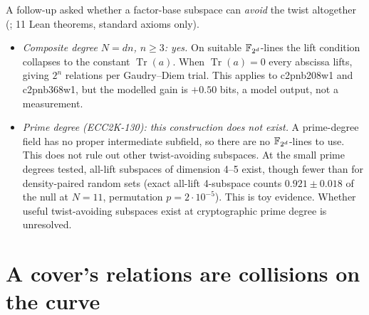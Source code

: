 A follow-up asked whether a factor-base subspace can \emph{avoid} the twist
altogether (; 11 Lean
theorems, standard axioms only).
\begin{itemize}
\item \emph{Composite degree $N=dn$, $n\ge3$: yes.} On suitable
  $\mathbb{F}_{2^d}$-lines the lift condition collapses to the constant
  $\operatorname{Tr}(a)$. When $\operatorname{Tr}(a)=0$ every abscissa
  lifts, giving $2^n$ relations per Gaudry--Diem trial. This applies to
  c2pnb208w1 and c2pnb368w1, but the modelled gain is $+0.50$ bits, a
  model output, not a measurement.
\item \emph{Prime degree (ECC2K-130): this construction does not exist.}
  A prime-degree field has no proper intermediate subfield, so there are no
  $\mathbb{F}_{2^d}$-lines to use. This does not rule out other twist-avoiding
  subspaces. At the small prime degrees tested, all-lift subspaces of
  dimension 4--5 exist, though fewer than for density-paired random sets
  (exact all-lift 4-subspace counts $0.921\pm0.018$ of the null at $N=11$,
  permutation $p=2\cdot10^{-5}$). This is toy evidence. Whether useful
  twist-avoiding subspaces exist at cryptographic prime degree is
  unresolved.
\end{itemize}

\section{A cover's relations are collisions on the curve}\label{sec:obs-pushforward}

